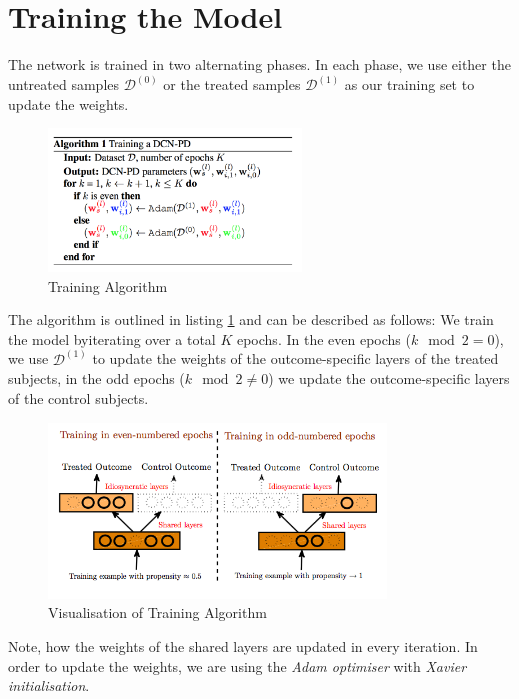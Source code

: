 \section{Training the Model}
The network is trained in two alternating phases. In each phase, we use either the untreated samples $\mathcal{D}^{(0)}$ or the treated samples $\mathcal{D}^{(1)}$ as our training set to update the weights. 
\begin{figure}[h]
	\centering
	\includegraphics[width=0.6\textwidth]{figures/chapter-3/training-algorithm.png}
	\caption{Training Algorithm}\label{fig:training-algorithm}
\end{figure}
The algorithm is outlined in listing \ref{fig:training-algorithm} and can be described as follows: We train the model byiterating over a total $K$ epochs. In the even epochs ($k \mod 2 = 0$), we use $\mathcal{D}^{(1)}$ to update the weights of the outcome-specific layers of the treated subjects, in the odd epochs ($k \mod 2 \neq 0$) we update the outcome-specific layers of the control subjects. 

\begin{figure}[h]
	\centering
	\includegraphics[width=0.8\textwidth]{figures/chapter-3/pbd-training.png}
	\caption{Visualisation of Training Algorithm}\label{fig:dcn-training}
\end{figure}


Note, how the weights of the shared layers are updated in every iteration. In order to update the weights, we are using the \emph{Adam optimiser} with \emph{Xavier initialisation}. %

